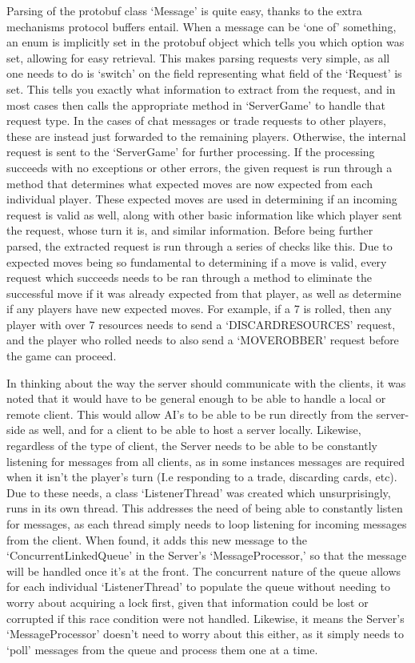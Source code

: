 \documentclass[a4paper,doc,draftfirst]{apa6}
\begin{document}
Parsing of the protobuf class ‘Message’ is quite easy, thanks to the extra mechanisms protocol buffers entail. When a message can be ‘one of’ something, an enum is implicitly set in the protobuf object which tells you which option was set, allowing for easy retrieval. This makes parsing requests very simple, as all one needs to do is ‘switch’ on the field representing what field of the ‘Request’ is set. This tells you exactly what information to extract from the request, and in most cases then calls the appropriate method in ‘ServerGame’ to handle that request type. In the cases of chat messages or trade requests to other players, these are instead just forwarded to the remaining players. Otherwise, the internal request is sent to the ‘ServerGame’ for further processing. If the processing succeeds with no exceptions or other errors, the given request is run through a method that determines what expected moves are now expected from each individual player. These expected moves are used in determining if an incoming request is valid as well, along with other basic information like which player sent the request, whose turn it is, and similar information. Before being further parsed, the extracted request is run through a series of checks like this. Due to expected moves being so fundamental to determining if a move is valid, every request  which succeeds needs to be ran through a method to eliminate the successful move if it was already expected from that player, as well as determine if any players have new expected moves. For example, if a 7 is rolled, then any player with over 7 resources needs to send a ‘DISCARDRESOURCES’ request, and the player who rolled needs to also send a ‘MOVEROBBER’ request before the game can proceed.

In thinking about the way the server should communicate with the clients, it was noted that it would have to be general enough to be able to handle a local or remote client. This would allow AI’s to be able to be run directly from the server-side as well, and for a client to be able to host a server locally. Likewise, regardless of the type of client, the Server needs to be able to be constantly listening for messages from all clients, as in some instances messages are required when it isn’t the player’s turn (I.e responding to a trade, discarding cards, etc). Due to these needs, a class ‘ListenerThread’ was created which unsurprisingly, runs in its own thread. This addresses the need of being able to constantly listen for messages, as each thread simply needs to loop listening for incoming messages from the client. When found, it adds this new message to the ‘ConcurrentLinkedQueue’ in the Server’s ‘MessageProcessor,’ so that the message will be handled once it’s at the front. The concurrent nature of the queue allows for each individual ‘ListenerThread’ to populate the queue without needing to worry about acquiring a lock first, given that information could be lost or corrupted if this race condition were not handled. Likewise, it means the Server’s ‘MessageProcessor’ doesn’t need to worry about this either, as it simply needs to ‘poll’ messages from the queue and process them one at a time.
\end{document}

